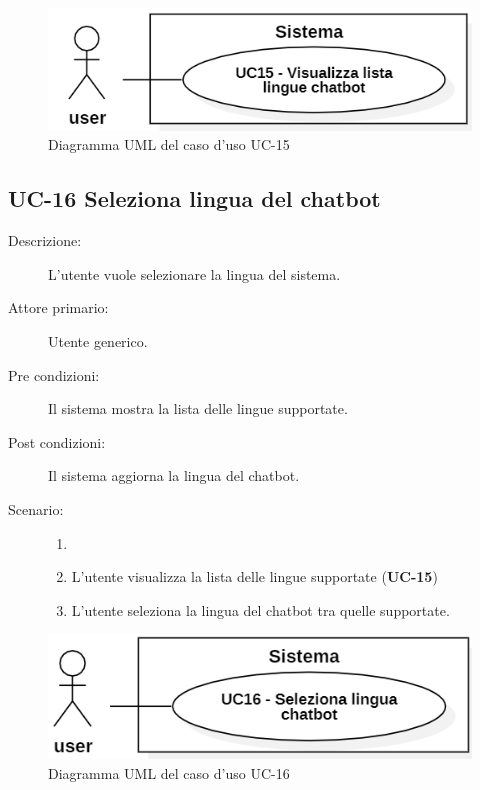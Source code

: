 \begin{figure}[H]
    \centering
    \includegraphics[width=0.8\linewidth]{UC15.PNG}
    \caption{Diagramma UML del caso d'uso UC-15}
\end{figure}

\subsection{UC-16 Seleziona lingua del chatbot}
\begin{description}
    \item[Descrizione:] L'utente vuole selezionare la lingua del sistema.
    \item[Attore primario:] Utente generico.
    \item[Pre condizioni:] Il sistema mostra la lista delle lingue supportate.
    \item[Post condizioni:] Il sistema aggiorna la lingua del chatbot.
    \item[Scenario:]
    \begin{enumerate}
        \item[]
        \item L'utente visualizza la lista delle lingue supportate (\textbf{UC-15})
        \item L’utente seleziona la lingua del chatbot tra quelle supportate.
    \end{enumerate}
\end{description}

\begin{figure}[H]
    \centering
    \includegraphics[width=0.8\linewidth]{UC16.PNG}
    \caption{Diagramma UML del caso d'uso UC-16}
\end{figure}

